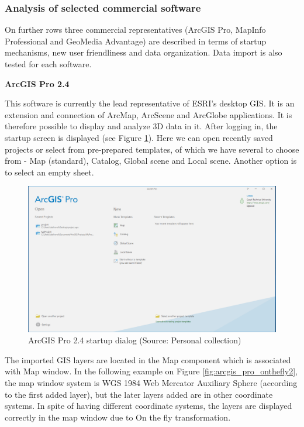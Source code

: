\documentclass[a4paper,10pt,twoside]{article}
\begin{document}
\subsubsection{Analysis of selected commercial software}

\noindent On further rows three commercial representatives (ArcGIS Pro, MapInfo Professional and GeoMedia Advantage) are described in terms of startup mechanisms, new user friendliness and data organization. Data import is also tested for each software. 

\bigskip

\noindent \textbf {ArcGIS Pro 2.4}

\noindent This software is currently the lead representative of ESRI's desktop GIS. It is an extension and connection of ArcMap, ArcScene and ArcGlobe applications. It is therefore possible to display and analyze 3D data in it. After logging in, the startup screen is displayed (see Figure \ref{fig:arcgis_startup_screen}). Here we can open recently saved projects or select from pre-prepared templates, of which we have several to choose from - Map (standard), Catalog, Global scene and Local scene. Another option is to select an empty sheet.

\vspace{0.3cm}
\begin{figure}[hbt!] 
\begin{center}
\includegraphics[width=16cm]{../pictures/arcgis_startup_screen.png} 
\caption[ArcGIS Pro 2.4 startup dialog]{ArcGIS Pro 2.4 startup dialog (Source: Personal collection)}
\label{fig:arcgis_startup_screen}
\end{center}
\end{figure}

\noindent The imported GIS layers are located in the Map component which is associated with Map window. In the following example on Figure \ref{fig:arcgis_pro_onthefly2}, the map window system is WGS 1984 Web Mercator Auxiliary Sphere (according to the first added layer), but the later layers added are in other coordinate systems. In spite of having different coordinate systems, the layers are displayed correctly in the map window due to On the fly transformation.
\end{document}
